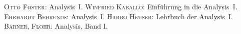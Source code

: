 \documentclass[ngerman,titlepage,twoside, parskip=half*]{scrreprt}
\theoremstyle{plain}
\theoremstyle{definition}
\theoremstyle{remark}
\begin{document}
\clearpage
\begin{thebibliography}{99}
 \textsc{Otto Foster}: Analysis~I.
 \textsc{Winfried Kaballo}: Einführung in die Analysis~I.
 \textsc{Ehrhardt Behrends}: Analysis~I.
 \textsc{Harro Heuser}: Lehrbuch der Analysis~I.
 \textsc{Barner}, \textsc{Flohr}: Analysis, Band I.
\end{thebibliography}

\printindex
\end{document}
